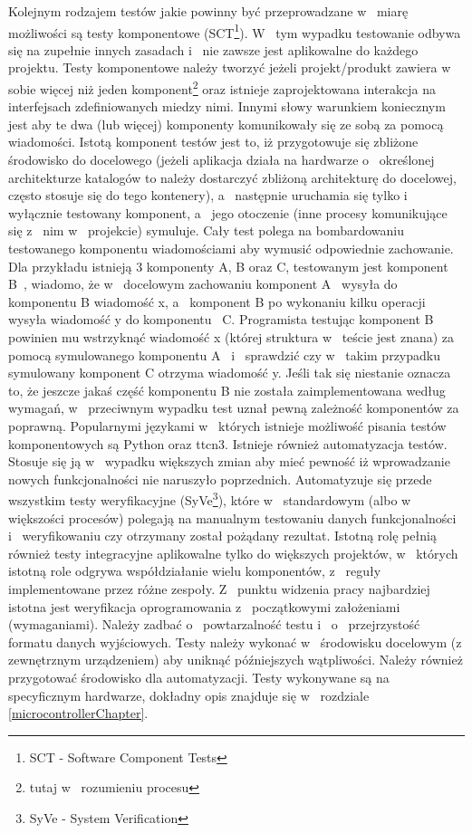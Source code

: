 \documentclass{BscUS}
\begin{document}
\indent Kolejnym rodzajem testów jakie powinny być przeprowadzane w~ miarę możliwości są testy komponentowe (SCT\footnote{SCT - Software Component Tests}). W~ tym wypadku testowanie odbywa się na zupełnie innych zasadach i~ nie zawsze jest aplikowalne do każdego projektu. Testy komponentowe należy tworzyć jeżeli projekt/produkt zawiera w~ sobie więcej niż jeden komponent\footnote{tutaj w~ rozumieniu procesu} oraz istnieje zaprojektowana interakcja na interfejsach zdefiniowanych miedzy nimi. Innymi słowy warunkiem koniecznym jest aby te dwa (lub więcej) komponenty komunikowały się ze sobą za pomocą wiadomości. Istotą komponent testów jest to, iż przygotowuje się zbliżone środowisko do docelowego (jeżeli aplikacja działa na hardwarze o~ określonej architekturze katalogów to należy dostarczyć zbliżoną architekturę do docelowej, często stosuje się do tego kontenery), a~ następnie uruchamia się tylko i~ wyłącznie testowany komponent, a~ jego otoczenie (inne procesy komunikujące się z~ nim w~ projekcie) symuluje. Cały test polega na bombardowaniu testowanego komponentu wiadomościami aby wymusić odpowiednie zachowanie. Dla przykładu istnieją 3 komponenty A, B oraz C, testowanym jest komponent~ B~, wiadomo, że w~ docelowym zachowaniu komponent A~ wysyła do komponentu B wiadomość x, a~ komponent B po wykonaniu kilku operacji wysyła wiadomość y do komponentu~ C. Programista testując komponent B powinien mu wstrzyknąć wiadomość x (której struktura w~ teście jest znana) za pomocą symulowanego komponentu A~ i~ sprawdzić czy w~ takim przypadku symulowany komponent C otrzyma wiadomość y. Jeśli tak się niestanie oznacza to, że jeszcze jakaś część komponentu B nie została zaimplementowana według wymagań, w~ przeciwnym wypadku test uznał pewną zależność komponentów za poprawną. Popularnymi językami w~ których istnieje możliwość pisania testów komponentowych są Python oraz ttcn3.
\newline
\indent Istnieje również automatyzacja testów. Stosuje się ją w~ wypadku większych zmian aby mieć pewność iż wprowadzanie nowych funkcjonalności nie naruszyło poprzednich. Automatyzuje się przede wszystkim testy weryfikacyjne (SyVe\footnote{SyVe - System Verification}), które w~ standardowym (albo w~ większości procesów) polegają na manualnym testowaniu danych funkcjonalności i~ weryfikowaniu czy otrzymany został pożądany rezultat. Istotną rolę pełnią również testy integracyjne aplikowalne tylko do większych projektów, w~ których istotną role odgrywa współdziałanie wielu komponentów, z~ reguły implementowane przez różne zespoły.
\newline
\indent Z~ punktu widzenia pracy najbardziej istotna jest weryfikacja oprogramowania z~ początkowymi założeniami (wymaganiami). Należy zadbać o~ powtarzalność testu i~ o~ przejrzystość formatu danych wyjściowych. Testy należy wykonać w~ środowisku docelowym (z zewnętrznym urządzeniem) aby uniknąć późniejszych wątpliwości. Należy również przygotować środowisko dla automatyzacji. Testy wykonywane są na specyficznym hardwarze, dokładny opis znajduje się w~ rozdziale \ref{microcontrollerChapter}.
\end{document}
